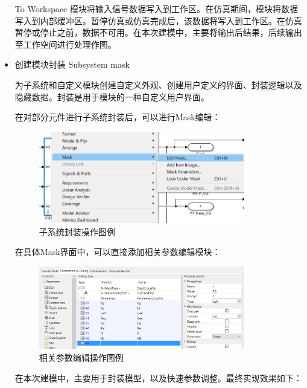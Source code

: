 \begin{itemize}
	To Workspace 模块将输入信号数据写入到工作区。在仿真期间，模块将数据写入到内部缓冲区。暂停仿真或仿真完成后，该数据将写入到工作区。在仿真暂停或停止之前，数据不可用。在本次建模中，主要将输出后结果，后续输出至工作空间进行处理作图。
	
	\item 创建模块封装 Subsystem mask
	
	为子系统和自定义模块创建自定义外观、创建用户定义的界面、封装逻辑以及隐藏数据。封装是用于模块的一种自定义用户界面。
	
	在对部分元件进行子系统封装后，可以进行Mask编辑：
	
	\begin{figure}[H]
		\centering
		\includegraphics[width=0.85\textwidth]{fig/simulink/mask_operation.png}
		\caption{子系统封装操作图例}\label{fig:mask_operation}
	\end{figure}
	
	在具体Mask界面中，可以直接添加相关参数编辑模块：
	
	\begin{figure}[H]
		\centering
		\includegraphics[width=0.85\textwidth]{fig/simulink/mask_interface.png}
		\caption{相关参数编辑操作图例}\label{fig:mask_interface}
	\end{figure}
	
	在本次建模中，主要用于封装模型，以及快速参数调整。最终实现效果如下：
	

\end{itemize}
